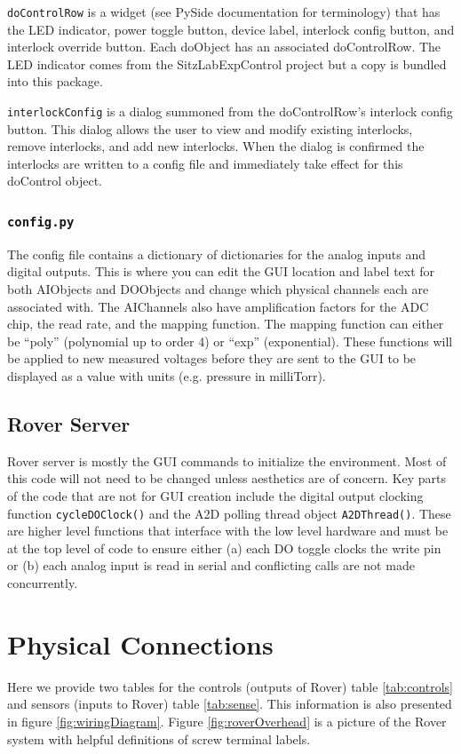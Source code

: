 \documentclass{article}
\begin{document}
\texttt{doControlRow} is a widget (see PySide documentation for terminology) that has the LED indicator, power toggle button, device label, interlock config button, and interlock override button. Each doObject has an associated doControlRow. The LED indicator comes from the SitzLabExpControl project but a copy is bundled into this package. 

\texttt{interlockConfig} is a dialog summoned from the doControlRow's interlock config button. This dialog allows the user to view and modify existing interlocks, remove interlocks, and add new interlocks. When the dialog is confirmed the interlocks are written to a config file and immediately take effect for this doControl object.


\subsubsection{\texttt{config.py}}
\label{sect:config}
The config file contains a dictionary of dictionaries for the analog inputs and digital outputs. This is where you can edit the GUI location and label text for both AIObjects and DOObjects and change which physical channels each are associated with. The AIChannels also have amplification factors for the ADC chip, the read rate, and the mapping function. The mapping function can either be ``poly'' (polynomial up to order 4) or ``exp'' (exponential). These functions will be applied to new measured voltages before they are sent to the GUI to be displayed as a value with units (e.g. pressure in milliTorr).


\subsection{Rover Server}
Rover server is mostly the GUI commands to initialize the environment. Most of this code will not need to be changed unless aesthetics are of concern. Key parts of the code that are not for GUI creation include the digital output clocking function \texttt{cycleDOClock()} and the A2D polling thread object \texttt{A2DThread()}. These are higher level functions that interface with the low level hardware and must be at the top level of code to ensure either (a) each DO toggle clocks the write pin or (b) each analog input is read in serial and conflicting calls are not made concurrently.


\section{Physical Connections}
Here we provide two tables for the controls (outputs of Rover) table \ref{tab:controls} and sensors (inputs to Rover) table \ref{tab:sense}. This information is also presented in figure \ref{fig:wiringDiagram}. Figure \ref{fig:roverOverhead} is a picture of the Rover system with helpful definitions of screw terminal labels.
\end{document}
